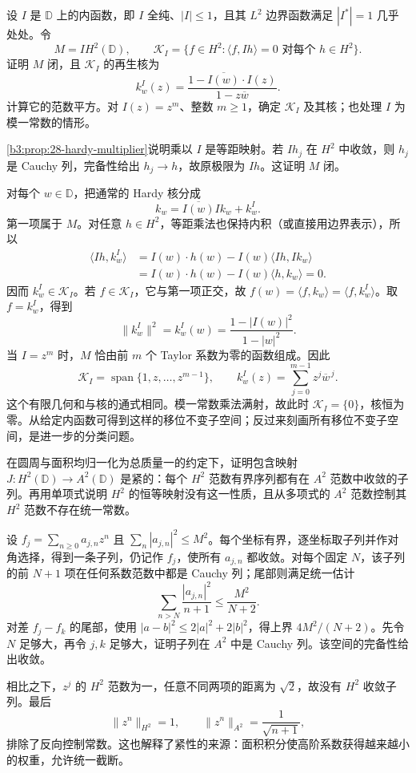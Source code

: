\begin{exercise}\label{b3:ex:28-4}
设 \(I\) 是 \(\mathbb D\) 上的内函数，即 \(I\) 全纯、\(|I|\le1\)，且其 \(L^2\) 边界函数满足 \(|I^*|=1\) 几乎处处。令
\[
 M=I H^2(\mathbb D),\qquad
 \mathcal K_I=\{f\in H^2:\langle f,Ih\rangle=0\text{ 对每个 }h\in H^2\}.
\]
证明 \(M\) 闭，且 \(\mathcal K_I\) 的再生核为
\[
 k_w^I(z)=\frac{1-\overline{I(w)}\cdot I(z)}{1-z\overline w}.
\]
计算它的范数平方。对 \(I(z)=z^m\)、整数 \(m\ge1\)，确定 \(\mathcal K_I\) 及其核；也处理 \(I\) 为模一常数的情形。
\end{exercise}
\begin{solution}
\cref{b3:prop:28-hardy-multiplier}说明乘以 \(I\) 是等距映射。若 \(Ih_j\) 在 \(H^2\) 中收敛，则 \(h_j\) 是 Cauchy 列，完备性给出 \(h_j\to h\)，故原极限为 \(Ih\)。这证明 \(M\) 闭。

对每个 \(w\in\mathbb D\)，把通常的 Hardy 核分成
\[
 k_w=\overline{I(w)}I k_w+k_w^I.
\]
第一项属于 \(M\)。对任意 \(h\in H^2\)，等距乘法也保持内积（或直接用边界表示），所以
\[
 \begin{aligned}
 \langle Ih,k_w^I\rangle
 &=I(w)\cdot h(w)-I(w)\langle Ih,I k_w\rangle\\
 &=I(w)\cdot h(w)-I(w)\langle h,k_w\rangle=0.
 \end{aligned}
\]
因而 \(k_w^I\in\mathcal K_I\)。若 \(f\in\mathcal K_I\)，它与第一项正交，故 \(f(w)=\langle f,k_w\rangle=\langle f,k_w^I\rangle\)。取 \(f=k_w^I\)，得到
\[
 \|k_w^I\|^2=k_w^I(w)=\frac{1-|I(w)|^2}{1-|w|^2}.
\]
当 \(I=z^m\) 时，\(M\) 恰由前 \(m\) 个 Taylor 系数为零的函数组成。因此
\[
 \mathcal K_I=\operatorname{span}\{1,z,\ldots,z^{m-1}\},
 \qquad k_w^I(z)=\sum_{j=0}^{m-1}z^j\overline w^{\,j}.
\]
这个有限几何和与核的通式相同。模一常数乘法满射，故此时 \(\mathcal K_I=\{0\}\)，核恒为零。从给定内函数可得到这样的移位不变子空间；反过来刻画所有移位不变子空间，是进一步的分类问题。
\end{solution}

\begin{exercise}\label{b3:ex:28-5}
在圆周与面积均归一化为总质量一的约定下，证明包含映射 \(J:H^2(\mathbb D)\to A^2(\mathbb D)\) 是紧的：每个 \(H^2\) 范数有界序列都有在 \(A^2\) 范数中收敛的子列。再用单项式说明 \(H^2\) 的恒等映射没有这一性质，且从多项式的 \(A^2\) 范数控制其 \(H^2\) 范数不存在统一常数。
\end{exercise}
\begin{solution}
设 \(f_j=\sum_{n\ge0}a_{j,n}z^n\) 且 \(\sum_n|a_{j,n}|^2\le M^2\)。每个坐标有界，逐坐标取子列并作对角选择，得到一条子列，仍记作 \(f_j\)，使所有 \(a_{j,n}\) 都收敛。对每个固定 \(N\)，该子列的前 \(N+1\) 项在任何系数范数中都是 Cauchy 列；尾部则满足统一估计
\[
 \sum_{n>N}\frac{|a_{j,n}|^2}{n+1}\le\frac{M^2}{N+2}.
\]
对差 \(f_j-f_k\) 的尾部，使用 \(|a-b|^2\le2|a|^2+2|b|^2\)，得上界 \(4M^2/(N+2)\)。先令 \(N\) 足够大，再令 \(j,k\) 足够大，证明子列在 \(A^2\) 中是 Cauchy 列。该空间的完备性给出收敛。

相比之下，\(z^j\) 的 \(H^2\) 范数为一，任意不同两项的距离为 \(\sqrt2\)，故没有 \(H^2\) 收敛子列。最后
\[
 \|z^n\|_{H^2}=1,\qquad \|z^n\|_{A^2}=\frac1{\sqrt{n+1}},
\]
排除了反向控制常数。这也解释了紧性的来源：面积积分使高阶系数获得越来越小的权重，允许统一截断。
\end{solution}

